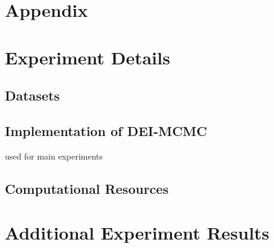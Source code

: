 \section{Appendix}\label{app}

\section{Experiment Details}
\subsection{Datasets}
\subsection{Implementation of DEI-MCMC}
used for main experiments

\subsection{Computational Resources}

\section{Additional Experiment Results}
